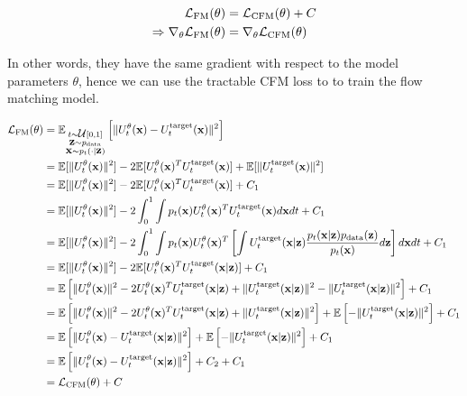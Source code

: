 \documentclass[a4paper, 11pt]{article}
\begin{document}
\begin{align}
    \fL_{\text{FM}}(\theta) &= \fL_{\text{CFM}}(\theta) + C \\
    \Rightarrow \nabla_{\theta} \fL_{\text{FM}}(\theta) &= \nabla_{\theta}\fL_{\text{CFM}}(\theta)
\end{align}

In other words, they have the same gradient with respect to the model parameters $\theta$, hence we can use the tractable CFM loss to to train the flow matching model.


\begin{align}
    \fL_{\text{FM}}(\theta) &= \E_{\substack{t \sim \fU[0, 1] \\ 
    \vz \sim p_{\text{data}} \\
    \vx \sim p_t(\cdot | \vz)}} \left [ \|U_t^{\theta}(\vx) - U_t^{\text{target}}(\vx) \|^2 \right ] \\
    &= \E [ \|U_t^{\theta}(\vx) \|^2 ] - 2 \E [U_t^{\theta}(\vx)^T U_t^{\text{target}}(\vx)  ] + \E[\|U_t^{\text{target}}(\vx)\|^2] \\
    &= \E [ \|U_t^{\theta}(\vx) \|^2 ] - 2 \E [U_t^{\theta}(\vx)^T U_t^{\text{target}}(\vx)  ] + C_1 \\
    &= \E [ \|U_t^{\theta}(\vx) \|^2 ] - 2 \int_0^1 \int p_t(\vx) U_t^{\theta}(\vx)^T U_t^{\text{target}}(\vx) d\vx dt  + C_1 \\
    &= \E [ \|U_t^{\theta}(\vx) \|^2 ] - 2 \int_0^1 \int p_t(\vx) U_t^{\theta}(\vx)^T \left [ \int U_t^{\text{target}}(\vx | \vz) \frac{p_t( \vx|\vz)p_{\text{data}}(\vz)}{p_t(\vx)} d\vz \right ] d\vx dt  + C_1 \\
    &= \E [ \|U_t^{\theta}(\vx) \|^2 ] - 2 \E [U_t^{\theta}(\vx)^T U_t^{\text{target}}(\vx | \vz)  ]  + C_1 \\
    &= \E \left [ \|U_t^{\theta}(\vx) \|^2  - 2U_t^{\theta}(\vx)^T U_t^{\text{target}}(\vx | \vz)  + \|U_t^{\text{target}}(\vx | \vz)\|^2 - \|U_t^{\text{target}}(\vx | \vz)\|^2 \right ]  + C_1 \\
    &= \E \left [ \|U_t^{\theta}(\vx) \|^2  - 2U_t^{\theta}(\vx)^T U_t^{\text{target}}(\vx | \vz)  + \|U_t^{\text{target}}(\vx | \vz)\|^2 \right ] + \E \left  [- \|U_t^{\text{target}}(\vx | \vz)\|^2 \right ]  + C_1 \\
    &= \E \left [ \|U_t^{\theta}(\vx) - U_t^{\text{target}}(\vx | \vz) \|^2 \right ] + \E \left  [- \|U_t^{\text{target}}(\vx | \vz)\|^2 \right ]  + C_1 \\
    &= \E \left [ \|U_t^{\theta}(\vx) - U_t^{\text{target}}(\vx | \vz) \|^2 \right ] + C_2  + C_1 \\
    &= \fL_{\text{CFM}}(\theta) + C
\end{align}
\end{document}
